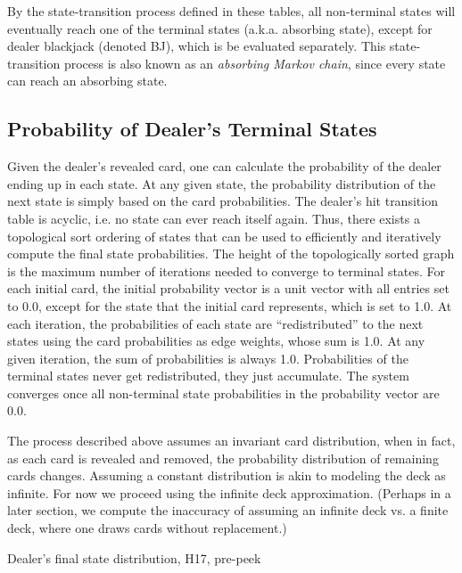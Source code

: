 By the state-transition process defined in these tables,
all non-terminal states will eventually reach
one of the terminal states (a.k.a. absorbing state), 
except for dealer blackjack (denoted BJ), 
which is be evaluated separately.
This state-transition process is also known as an
\emph{absorbing Markov chain},
since every state can reach an absorbing state.


\subsection{Probability of Dealer's Terminal States}
\label{sec:rules:dealer-play:final-pdf}

Given the dealer's revealed card, 
one can calculate the probability of the dealer ending up in each state.
At any given state, the probability distribution of the
next state is simply based on the card probabilities.  
The dealer's hit transition table is acyclic, i.e. 
no state can ever reach itself again.  
Thus, there exists a topological sort
ordering of states that can be used to efficiently and iteratively 
compute the final state probabilities.
The height of the topologically sorted graph is the maximum 
number of iterations needed to converge to terminal states.
For each initial card, the initial probability vector
is a unit vector with all entries set to 0.0, except for the state
that the initial card represents, which is set to 1.0.
At each iteration, the probabilities of each state are 
``redistributed'' to the next states using the 
card probabilities as edge weights, whose sum is 1.0.  
At any given iteration, the sum of probabilities is always 1.0.
Probabilities of the terminal states never get redistributed, 
they just accumulate.  
The system converges once all non-terminal state probabilities 
in the probability vector are 0.0.

The process described above assumes an invariant
card distribution, when in fact, as each card is revealed and removed, 
the probability distribution of remaining cards changes.
Assuming a constant distribution is akin to modeling
the deck as infinite.
For now we proceed using the infinite deck approximation.  
(Perhaps in a later section, we compute the inaccuracy of
assuming an infinite deck vs. a finite deck, where one 
draws cards without replacement.)


\begin{table}[ht!]
\caption{Dealer's final state distribution, H17, pre-peek}
\begin{center}

\end{center}
\label{tab:dealer-final-H17-pre-peek}
\end{table}

